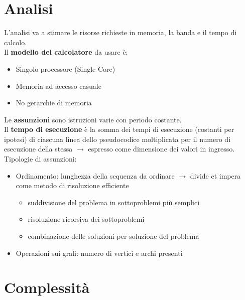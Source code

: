 \documentclass[12pt,a4paper]{article}
\begin{document}
\section{Analisi}
L'analisi va a stimare le risorse richieste in memoria, la banda e il tempo di calcolo.\\
Il \textbf{modello del calcolatore} da usare è:
\begin{itemize}
\item Singolo processore (Single Core)
\item Memoria ad accesso casuale
\item No gerarchie di memoria
\end{itemize}
Le \textbf{assunzioni} sono istruzioni varie con periodo costante.\\
Il \textbf{tempo di esecuzione} è la somma dei tempi di esecuzione (costanti per ipotesi) di ciascuna linea dello pseudocodice moltiplicata per il numero di esecuzione della stessa $\rightarrow$ espresso come dimensione dei valori in ingresso.\\
Tipologie di assunzioni:
\begin{itemize}
\item Ordinamento: lunghezza della sequenza da ordinare $\rightarrow$ divide et impera come metodo di risoluzione efficiente
\begin{itemize}
\item suddivisione del problema in sottoproblemi più semplici
\item risoluzione ricorsiva dei sottoproblemi
\item combinazione delle soluzioni per soluzione del problema
\end{itemize}
\item Operazioni sui grafi: numero di vertici e archi presenti
\end{itemize}

\clearpage
\section{Complessità}
\end{document}
